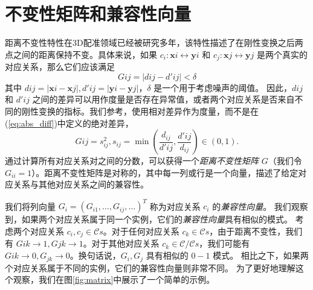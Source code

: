 \section{不变性矩阵和兼容性向量}
\label{subsec:Distance-Consistency-Graph}
距离不变性特性在3D配准领域已经被研究多年\cite{TEASER}\cite{shi2021robin}\cite{leordeanu2005spectral}，该特性描述了在刚性变换之后两点之间的距离保持不变。具体来说，如果 $c_i :\mathbf{x}i \leftrightarrow \mathbf{y}i$ 和 $c_j : \mathbf{x}j \leftrightarrow \mathbf{y}j$ 是两个真实的对应关系，那么它们应该满足
%
\begin{equation}
G{ij}=|d{ij} - d'{ij} | < \delta
\label{eq:abs_diff}
\end{equation}
其中 $d{ij} = |\mathbf{x}i-\mathbf{x}j|, d'{ij}=|\mathbf{y}i -\mathbf{y}j|$，$\delta $ 是一个用于考虑噪声的阈值。
因此，$d{ij}$ 和 $d'{ij}$ 之间的差异可以用作度量是否存在异常值，或者两个对应关系是否来自不同的刚性变换的指标。我们参考\cite{matrix}，使用相对差异作为度量，而不是在(\ref{eq:abs_diff})中定义的绝对差异，
\begin{equation}
G{ij} = s_{ij}^2, s_{ij} = \min( \frac{d_{ij}}{d'{ij}}, \frac{d'{ij}}{d_{ij}}) \in (0, 1).
\end{equation}
通过计算所有对应关系对之间的分数，可以获得一个\emph{距离不变性矩阵} $G$（我们令 $G_{ii} = 1$）。距离不变性矩阵是对称的，其中每一列或行是一个向量，描述了给定对应关系与其他对应关系之间的兼容性\cite{reviewof3dourlierremovingjiaqiYang}。

我们将列向量 $G_i = (G_{i1}, \ldots , G_{ij}, \ldots)^T$ 称为对应关系 $c_i$ 的\emph{兼容性向量}。
我们观察到，如果两个对应关系属于同一个实例，它们的\emph{兼容性向量}具有相似的模式。
考虑两个对应关系 $c_i, c_j \in \mathcal{C}s$。对于任何对应关系 $c_k \in \mathcal{C}s$，由于距离不变性，我们有 $G{ik} \rightarrow 1, G{jk} \rightarrow 1$。对于其他对应关系 $c_k \in \mathcal{C}/\mathcal{C}s$，我们可能有 $G{ik} \rightarrow 0, G_{jk} \rightarrow 0$。换句话说，$G_i,G_j$ 具有相似的 $0-1$ 模式。
相比之下，如果两个对应关系属于不同的实例，它们的兼容性向量则非常不同。
为了更好地理解这个观察，我们在图\ref{fig:matrix}中展示了一个简单的示例。

